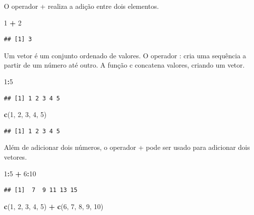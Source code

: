 \documentclass[
]{book}
\newenvironment{Shaded}{\begin{snugshade}}{\end{snugshade}}
\newcommand{\DecValTok}[1]{\textcolor[rgb]{0.00,0.00,0.81}{#1}}
\newcommand{\FunctionTok}[1]{\textcolor[rgb]{0.13,0.29,0.53}{\textbf{#1}}}
\newcommand{\NormalTok}[1]{#1}
\newcommand{\SpecialCharTok}[1]{\textcolor[rgb]{0.81,0.36,0.00}{\textbf{#1}}}
\begin{document}
O operador + realiza a adição entre dois elementos.

\begin{Shaded}
\begin{Highlighting}[]
\DecValTok{1} \SpecialCharTok{+} \DecValTok{2}
\end{Highlighting}
\end{Shaded}

\begin{verbatim}
## [1] 3
\end{verbatim}

Um vetor é um conjunto ordenado de valores.
O operador : cria uma sequência a partir de um número até outro.
A função c concatena valores, criando um vetor.

\begin{Shaded}
\begin{Highlighting}[]
\DecValTok{1}\SpecialCharTok{:}\DecValTok{5}
\end{Highlighting}
\end{Shaded}

\begin{verbatim}
## [1] 1 2 3 4 5
\end{verbatim}

\begin{Shaded}
\begin{Highlighting}[]
\FunctionTok{c}\NormalTok{(}\DecValTok{1}\NormalTok{, }\DecValTok{2}\NormalTok{, }\DecValTok{3}\NormalTok{, }\DecValTok{4}\NormalTok{, }\DecValTok{5}\NormalTok{)}
\end{Highlighting}
\end{Shaded}

\begin{verbatim}
## [1] 1 2 3 4 5
\end{verbatim}

Além de adicionar dois números, o operador + pode ser usado para adicionar dois vetores.

\begin{Shaded}
\begin{Highlighting}[]
\DecValTok{1}\SpecialCharTok{:}\DecValTok{5} \SpecialCharTok{+} \DecValTok{6}\SpecialCharTok{:}\DecValTok{10}
\end{Highlighting}
\end{Shaded}

\begin{verbatim}
## [1]  7  9 11 13 15
\end{verbatim}

\begin{Shaded}
\begin{Highlighting}[]
\FunctionTok{c}\NormalTok{(}\DecValTok{1}\NormalTok{, }\DecValTok{2}\NormalTok{, }\DecValTok{3}\NormalTok{, }\DecValTok{4}\NormalTok{, }\DecValTok{5}\NormalTok{) }\SpecialCharTok{+} \FunctionTok{c}\NormalTok{(}\DecValTok{6}\NormalTok{, }\DecValTok{7}\NormalTok{, }\DecValTok{8}\NormalTok{, }\DecValTok{9}\NormalTok{, }\DecValTok{10}\NormalTok{)}
\end{Highlighting}
\end{Shaded}
\end{document}
